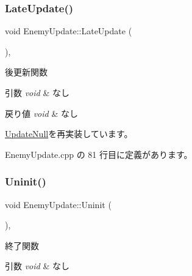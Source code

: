 \mbox{\label{class_enemy_update_ae14e4ebb42ad9043534e53edcba5b242}} 
\subsubsection{\texorpdfstring{Late\+Update()}{LateUpdate()}}
{\footnotesize\ttfamily void Enemy\+Update\+::\+Late\+Update (\begin{DoxyParamCaption}{ }\end{DoxyParamCaption})\hspace{0.3cm}{\ttfamily [override]}, {\ttfamily [virtual]}}



後更新関数 


\begin{DoxyParams}{引数}
{\em void} & なし \\
\hline
\end{DoxyParams}

\begin{DoxyRetVals}{戻り値}
{\em void} & なし \\
\hline
\end{DoxyRetVals}


\mbox{\hyperlink{class_update_null_a8d335882bce4eab384d44c4bae474ee5}{Update\+Null}}を再実装しています。



 Enemy\+Update.\+cpp の 81 行目に定義があります。

\mbox{\label{class_enemy_update_a294a5d4c65551af43e933cb65036f279}} 
\subsubsection{\texorpdfstring{Uninit()}{Uninit()}}
{\footnotesize\ttfamily void Enemy\+Update\+::\+Uninit (\begin{DoxyParamCaption}{ }\end{DoxyParamCaption})\hspace{0.3cm}{\ttfamily [override]}, {\ttfamily [virtual]}}



終了関数 


\begin{DoxyParams}{引数}
{\em void} & なし \\
\hline
\end{DoxyParams}

